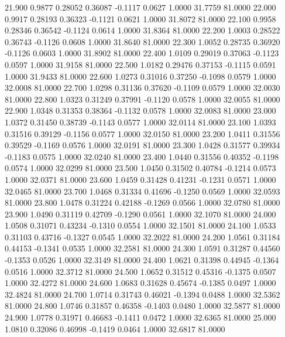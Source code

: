   21.900   0.9877   0.28052   0.36087  -0.1117   0.0627   1.0000  31.7759  81.0000
  22.000   0.9917   0.28193   0.36323  -0.1121   0.0621   1.0000  31.8072  81.0000
  22.100   0.9958   0.28346   0.36542  -0.1124   0.0614   1.0000  31.8364  81.0000
  22.200   1.0003   0.28522   0.36743  -0.1126   0.0608   1.0000  31.8640  81.0000
  22.300   1.0052   0.28735   0.36920  -0.1126   0.0603   1.0000  31.8902  81.0000
  22.400   1.0109   0.29019   0.37063  -0.1123   0.0597   1.0000  31.9158  81.0000
  22.500   1.0182   0.29476   0.37153  -0.1115   0.0591   1.0000  31.9433  81.0000
  22.600   1.0273   0.31016   0.37250  -0.1098   0.0579   1.0000  32.0008  81.0000
  22.700   1.0298   0.31136   0.37620  -0.1109   0.0579   1.0000  32.0030  81.0000
  22.800   1.0323   0.31249   0.37991  -0.1120   0.0578   1.0000  32.0055  81.0000
  22.900   1.0348   0.31353   0.38364  -0.1132   0.0578   1.0000  32.0083  81.0000
  23.000   1.0372   0.31450   0.38739  -0.1143   0.0577   1.0000  32.0114  81.0000
  23.100   1.0393   0.31516   0.39129  -0.1156   0.0577   1.0000  32.0150  81.0000
  23.200   1.0411   0.31556   0.39529  -0.1169   0.0576   1.0000  32.0191  81.0000
  23.300   1.0428   0.31577   0.39934  -0.1183   0.0575   1.0000  32.0240  81.0000
  23.400   1.0440   0.31556   0.40352  -0.1198   0.0574   1.0000  32.0299  81.0000
  23.500   1.0450   0.31502   0.40784  -0.1214   0.0573   1.0000  32.0371  81.0000
  23.600   1.0459   0.31428   0.41231  -0.1231   0.0571   1.0000  32.0465  81.0000
  23.700   1.0468   0.31334   0.41696  -0.1250   0.0569   1.0000  32.0593  81.0000
  23.800   1.0478   0.31224   0.42188  -0.1269   0.0566   1.0000  32.0780  81.0000
  23.900   1.0490   0.31119   0.42709  -0.1290   0.0561   1.0000  32.1070  81.0000
  24.000   1.0508   0.31071   0.43234  -0.1310   0.0554   1.0000  32.1501  81.0000
  24.100   1.0533   0.31103   0.43716  -0.1327   0.0545   1.0000  32.2022  81.0000
  24.200   1.0561   0.31184   0.44153  -0.1341   0.0535   1.0000  32.2581  81.0000
  24.300   1.0591   0.31287   0.44560  -0.1353   0.0526   1.0000  32.3149  81.0000
  24.400   1.0621   0.31398   0.44945  -0.1364   0.0516   1.0000  32.3712  81.0000
  24.500   1.0652   0.31512   0.45316  -0.1375   0.0507   1.0000  32.4272  81.0000
  24.600   1.0683   0.31628   0.45674  -0.1385   0.0497   1.0000  32.4824  81.0000
  24.700   1.0714   0.31743   0.46021  -0.1394   0.0488   1.0000  32.5362  81.0000
  24.800   1.0746   0.31857   0.46358  -0.1403   0.0480   1.0000  32.5877  81.0000
  24.900   1.0778   0.31971   0.46683  -0.1411   0.0472   1.0000  32.6365  81.0000
  25.000   1.0810   0.32086   0.46998  -0.1419   0.0464   1.0000  32.6817  81.0000
